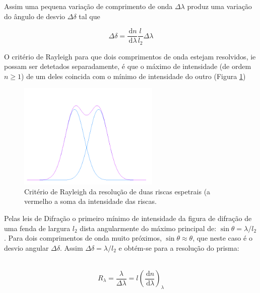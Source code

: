 \documentclass[a4paper,12pt]{article}  %
\newcommand{\ud}{\,\mathrm{d}}
\begin{document}
Assim uma pequena variação de comprimento de onda $\Delta \lambda$ produz uma variação do ângulo de desvio $\Delta \delta$  tal que 

\begin{equation}
	\label{eq:Delt_delta}
	\Delta \delta =  \frac{\ud n}{\ud \lambda} \frac{l}{l_2} \Delta \lambda 
\end{equation}

O critério de Rayleigh para que dois comprimentos de onda estejam resolvidos, ie possam ser detetados separadamente, é que o máximo de intensidade (de ordem $n \ge 1$) de um deles coincida com o mínimo de intensidade do outro (Figura \ref{fig:gauss})

\begin{figure}[ht]  \centering 
	\includegraphics[width=0.6\textwidth]{gauss}
	\caption{Critério de Rayleigh da resolução de duas riscas espetrais (a vermelho a soma da intensidade das riscas. \label{fig:gauss}} 
\end{figure}

Pelas leis de Difração o primeiro mínimo de intensidade da figura de difração de uma fenda de largura $l_2$ dista angularmente do máximo principal de:  $\sin \theta = \lambda/l_2$.
Para dois comprimentos de onda muito próximos, $\sin  \theta \approx \theta $, que neste caso é o desvio angular $\Delta \delta$. Assim $\Delta \delta= \lambda / l_2$ e obtém-se para a resolução do prisma: 

~\begin{equation}
	\label{eq:resolup}
	R_\lambda  =  \frac{\lambda}{\Delta \lambda} = l \left(\frac{\ud n}{\ud \lambda} \right )_\lambda 
\end{equation}
\end{document}
